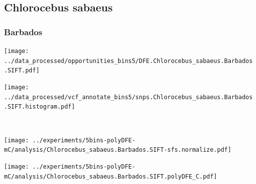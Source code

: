 \subsection{Chlorocebus sabaeus}

\subsubsection{Barbados}

\begin{minipage}{0.49\linewidth}
    \texttt{[image: ../data\_processed/opportunities\_bins5/DFE.Chlorocebus\_sabaeus.Barbados.SIFT.pdf]}
\end{minipage}
\begin{minipage}{0.49\linewidth}
    \texttt{[image: ../data\_processed/vcf\_annotate\_bins5/snps.Chlorocebus\_sabaeus.Barbados.SIFT.histogram.pdf]}
\end{minipage}
\\
\begin{minipage}{0.49\linewidth}
    \texttt{[image: ../experiments/5bins-polyDFE-mC/analysis/Chlorocebus\_sabaeus.Barbados.SIFT-sfs.normalize.pdf]}
\end{minipage}
\begin{minipage}{0.4\linewidth}
    \texttt{[image: ../experiments/5bins-polyDFE-mC/analysis/Chlorocebus\_sabaeus.Barbados.SIFT.polyDFE\_C.pdf]}
\end{minipage}
